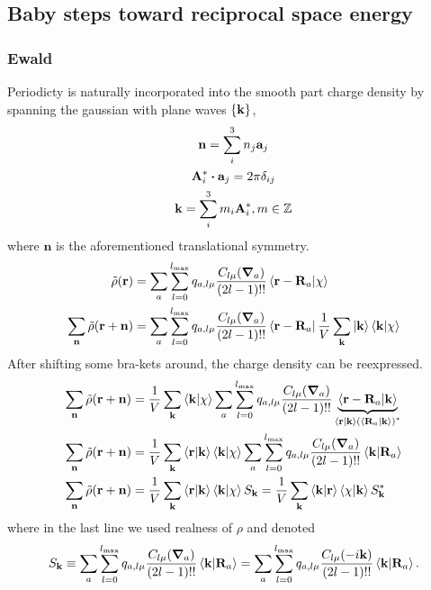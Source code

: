 \documentclass[12pt]{extarticle}
\renewcommand{\bf}{\mathbf}
\begin{document}
    \subsection{Baby steps toward reciprocal space energy}
    \subsubsection{Ewald}
    Periodicty is naturally incorporated into the smooth part charge density by spanning the gaussian with plane waves \(\qty{ \bf k}\), \begin{gather*}
        \bf n = \sum_i^3 n_j \bf a_j\\
        \bf A^*_i \dotproduct \bf a_j = 2 \pi \delta_{ij}\\
        \bf k = \sum_i^3 m_i \bf A^*_i, m \in \mathbb{Z}
    \end{gather*}
    where \(\bf n\) is the aforementioned translational symmetry.
    \begin{align*}
        \tilde{\rho} ( \bf r) &=  \sum_{a} \sum_{l = 0}^{l_{\max}} q_{a, l \mu} \frac{C_{l \mu} (\grad_a)}{(2l - 1)!!} \bra{\bf r - \bf R_a} \ket{\chi } \\
        \sum_{\bf n} \tilde{\rho} ( \bf r + \bf n) &=  \sum_{a} \sum_{l = 0}^{l_{\max}} q_{a, l \mu} \frac{C_{l \mu} (\grad_a)}{(2l - 1)!!} \bra{\bf r - \bf R_a} \frac{1}{V}\sum_{\bf k} \ket{\bf k} \bra{\bf k}  \ket{\chi } 
    \end{align*}
    After shifting some bra-kets around, the charge density can be reexpressed.
    \begin{align}
        \sum_{\bf n} \tilde{\rho} ( \bf r + \bf n) &= \frac{1}{V}\sum_{\bf k}  \bra{\bf k}  \ket{\chi }  \sum_{a} \sum_{l = 0}^{l_{\max}} q_{a, l \mu} \frac{C_{l \mu} (\grad_a)}{(2l - 1)!!} \underbrace{\bra{\bf r - \bf R_a} \ket{\bf k}}_{\bra{\bf r} \ket{\bf k} \pqty{\bra{\bf R_a} \ket{\bf k} }^*  } \nonumber\\
        \sum_{\bf n} \tilde{\rho} ( \bf r + \bf n) &= \frac{1}{V}\sum_{\bf k} \bra{\bf r} \ket{\bf k}  \bra{\bf k}  \ket{\chi }  \sum_{a} \sum_{l = 0}^{l_{\max}} q_{a, l \mu} \frac{C_{l \mu} (\grad_a)}{(2l - 1)!!} \bra{\bf k} \ket{\bf R_a} \nonumber\\
        \sum_{\bf n} \tilde{\rho} ( \bf r + \bf n) &= \frac{1}{V}\sum_{\bf k} \bra{\bf r} \ket{\bf k}  \bra{\bf k}  \ket{\chi }  S_{\bf k} = \frac{1}{V}\sum_{\bf k} \bra{\bf k} \ket{\bf r}\bra{\chi }\ket{\bf k}  S_{\bf k}^* \label{eq:rhotil}
    \end{align}
    where in the last line we used realness of \(\rho\) and denoted \begin{equation}
        S_{\bf k} \equiv \sum_{a} \sum_{l = 0}^{l_{\max}} q_{a, l \mu} \frac{C_{l \mu} (\grad_a)}{(2l - 1)!!} \bra{\bf k} \ket{\bf R_a} = \sum_{a} \sum_{l = 0}^{l_{\max}} q_{a, l \mu} \frac{C_{l \mu} (-i \bf k )}{(2l - 1)!!} \bra{\bf k} \ket{\bf R_a}. \label{eq:esf}
    \end{equation}
\end{document}
